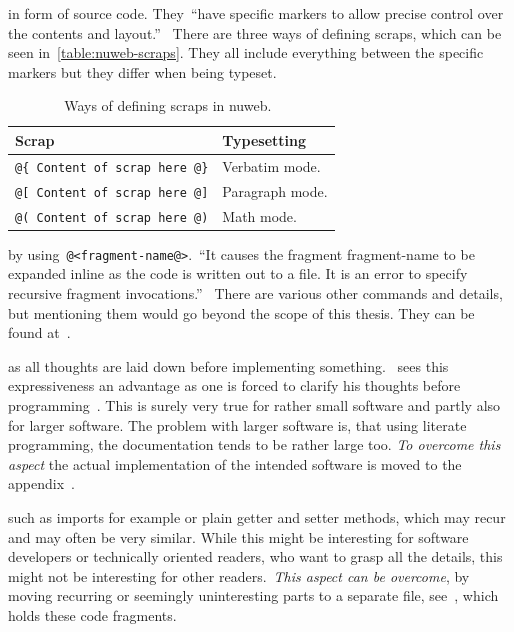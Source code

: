 \documentclass[%
    a4paper,    %
    justified,  %
    nobib,      %
    openany     %
]{tufte-book}
\begin{document}
 in form of source code. They~\enquote{have
specific markers to allow precise control over the contents and
layout.}~\cite{briggs-nuweb-93} There are three ways of defining scraps, which
can be seen in~\autoref{table:nuweb-scraps}. They all include everything between
the specific markers but they differ when being typeset.
\begin{table}[h]
  \caption{Ways of defining scraps in nuweb.~\cite[p. 3]{briggs-nuweb-93}}
  \label{table:nuweb-scraps}
  \begin{tabularx}{\textwidth}{lX}
    \toprule
    \textbf{Scrap} & \textbf{Typesetting}\\
    \midrule
    \verb|@{ Content of scrap here @}| & Verbatim mode.\\
    \verb|@[ Content of scrap here @]| & Paragraph mode.\\
    \verb|@( Content of scrap here @)| & Math mode.\\
    \bottomrule
  \end{tabularx}
\end{table}

 by
using~\verb|@<fragment-name@>|.~\enquote{It causes the fragment fragment-name
to be expanded inline as the code is written out to a file. It is an error to
specify recursive fragment invocations.}~\cite[p. 3]{briggs-nuweb-93} There are
various other commands and details, but mentioning them would go beyond the
scope of this thesis. They can be found at~\cite{briggs-nuweb-93}.

 as all thoughts are
laid down before implementing something.~\citeauthor{knuth-lp-1984} sees this
expressiveness an advantage as one is forced to clarify his thoughts before
programming~\cite[p. 13]{knuth-lp-1984}. This is surely very true for rather
small software and partly also for larger software. The problem with larger
software is, that using literate programming, the documentation tends to be
rather large too. \emph{To overcome this aspect} the actual implementation of
the intended software is moved to the appendix~.

 such as imports for example or plain getter and setter methods, which
may recur and may often be very similar. While this might be interesting for
software developers or technically oriented readers, who want to grasp all the
details, this might not be interesting for other readers.~\emph{This aspect can
be overcome}, by moving recurring or seemingly uninteresting parts to a separate
file, see~, which holds these code
fragments.
\end{document}
